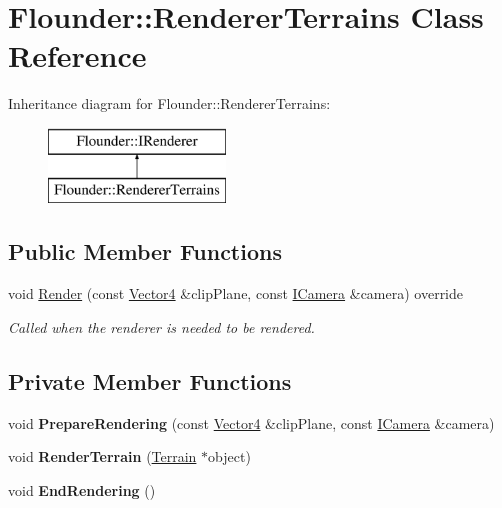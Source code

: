 \hypertarget{class_flounder_1_1_renderer_terrains}{}\section{Flounder\+:\+:Renderer\+Terrains Class Reference}
\label{class_flounder_1_1_renderer_terrains}
Inheritance diagram for Flounder\+:\+:Renderer\+Terrains\+:\begin{figure}[H]
\begin{center}
\leavevmode
\includegraphics[height=2.000000cm]{class_flounder_1_1_renderer_terrains}
\end{center}
\end{figure}
\subsection*{Public Member Functions}
\begin{DoxyCompactItemize}
\item 
void \hyperlink{class_flounder_1_1_renderer_terrains_a80430446c6982b2598de3f437d7097e3}{Render} (const \hyperlink{class_flounder_1_1_vector4}{Vector4} \&clip\+Plane, const \hyperlink{class_flounder_1_1_i_camera}{I\+Camera} \&camera) override
\begin{DoxyCompactList}\small\item\em Called when the renderer is needed to be rendered. \end{DoxyCompactList}\end{DoxyCompactItemize}
\subsection*{Private Member Functions}
\begin{DoxyCompactItemize}
\item 
\mbox{\label{class_flounder_1_1_renderer_terrains_a390c275cc6e5c14e17e308816f4548cc}} 
void {\bfseries Prepare\+Rendering} (const \hyperlink{class_flounder_1_1_vector4}{Vector4} \&clip\+Plane, const \hyperlink{class_flounder_1_1_i_camera}{I\+Camera} \&camera)
\item 
\mbox{\label{class_flounder_1_1_renderer_terrains_a4157ce6fd55a1589eb6dbe1f559465a0}} 
void {\bfseries Render\+Terrain} (\hyperlink{class_flounder_1_1_terrain}{Terrain} $\ast$object)
\item 
\mbox{\label{class_flounder_1_1_renderer_terrains_a1850cea68f707e24aee1db4526c45226}} 
void {\bfseries End\+Rendering} ()
\end{DoxyCompactItemize}
